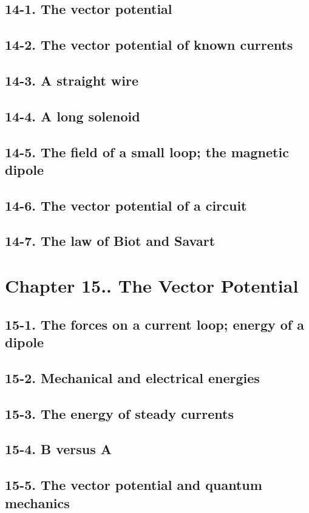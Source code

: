 \documentclass{article}
\begin{document}
\subsection{14-1. The vector potential}
\subsection{14-2. The vector potential of known currents}
\subsection{14-3. A straight wire}
\subsection{14-4. A long solenoid}
\subsection{14-5. The field of a small loop; the magnetic dipole}
\subsection{14-6. The vector potential of a circuit}
\subsection{14-7. The law of Biot and Savart}
\section{Chapter 15.. The Vector Potential}
\subsection{15-1. The forces on a current loop; energy of a dipole}
\subsection{15-2. Mechanical and electrical energies}
\subsection{15-3. The energy of steady currents}
\subsection{15-4. B versus A}
\subsection{15-5. The vector potential and quantum mechanics}
\end{document}
